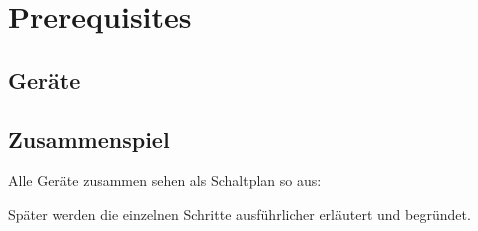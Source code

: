 \section{Prerequisites}


\subsection{Geräte}

\subsection{Zusammenspiel}

Alle Geräte zusammen sehen als Schaltplan so aus:

Später werden die einzelnen Schritte ausführlicher erläutert und begründet.